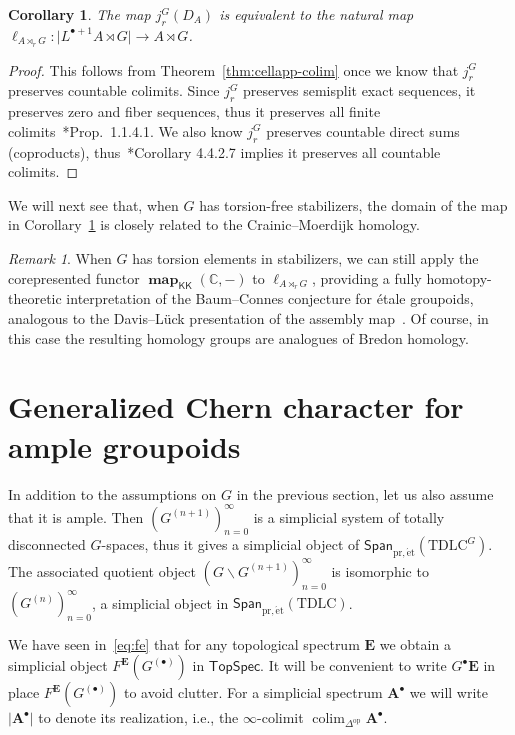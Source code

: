 \documentclass[a4paper,reqno]{amsart}
\theoremstyle{plain}
\newtheorem{corollary}[theorem]{Corollary}
\theoremstyle{definition}
\theoremstyle{remark}
\newtheorem{remark}[theorem]{Remark}
\numberwithin{equation}{section}
\newcommand{\dC}{\mathbb{C}}
\newcommand{\bA}{\mathbf{A}}
\newcommand{\bE}{\mathbf{E}}
\newcommand{\TopSpec}{\mathsf{TopSpec}}
\newcommand{\Span}{\mathsf{Span}}
\newcommand{\icKK}{\mathsf{KK}}
\newcommand{\gr}[1]{\lvert #1\rvert}
\newcommand{\pret}{\mathrm{pr,\acute{e}t}}
\newcommand{\TDLC}{\mathrm{TDLC}}
\DeclareMathOperator{\map}{\mathbf{map}}
\DeclareMathOperator*{\colim}{colim}
\begin{document}
\begin{corollary}\label{cor:pgrdesc}
The map $j^G_r(D_A)$ is equivalent to the natural map $\ell_{A\rtimes_r G}\colon \gr{L^{\bullet+1} A\rtimes G}\to A\rtimes G$.
\end{corollary}

\begin{proof}
      This follows from Theorem~\ref{thm:cellapp-colim} once we know that $j^G_r$ preserves countable colimits. Since $j^G_r$ preserves semisplit exact sequences, it preserves zero and fiber sequences, thus it preserves all finite colimits~\cite{lur:ha}*{Prop.~1.1.4.1}. We also know $j^G_r$ preserves countable direct sums (coproducts), thus~\cite{lur:ht}*{Corollary 4.4.2.7} implies it preserves all countable colimits.
\end{proof}

We will next see that, when $G$ has torsion-free stabilizers, the domain of the map in Corollary~\ref{cor:pgrdesc} is closely related to the Crainic--Moerdijk homology.

\begin{remark}
When $G$ has torsion elements in stabilizers, we can still apply the corepresented functor $\map_{\icKK}(\dC, -)$ to $\ell_{A\rtimes_r G}$, providing a fully homotopy-theoretic interpretation of the Baum--Connes conjecture for étale groupoids, analogous to the Davis--Lück presentation of the assembly map~\cite{dl:bc}.
Of course, in this case the resulting homology groups are analogues of Bredon homology.
\end{remark}

\section{Generalized Chern character for ample groupoids}\label{sec:grchern}

In addition to the assumptions on $G$ in the previous section, let us also assume that it is ample.
Then $(G^{(n+1)})^\infty_{n=0}$ is a simplicial system of totally disconnected $G$-spaces, thus it gives a simplicial object of $\Span_{\pret}(\TDLC^G)$.
The associated quotient object $(G\backslash G^{(n+1)})^\infty_{n=0}$ is isomorphic to $(G^{(n)})^\infty_{n=0}$, a simplicial object in $\Span_{\pret}(\TDLC)$. 

We have seen in~\eqref{eq:fe} that for any topological spectrum $\bE$ we obtain a simplicial object $F^\bE(G^{(\bullet)})$  in $\TopSpec$. It will be convenient to write $G^\bullet \bE$ in place $F^\bE(G^{(\bullet)})$ to avoid clutter.
For a simplicial  spectrum $\bA^\bullet$ we will write $\gr{\bA^\bullet}$ to denote its realization, i.e., the $\infty$-colimit $\colim_{\Delta^{\text{op}}}\bA^\bullet$. 
\end{document}

